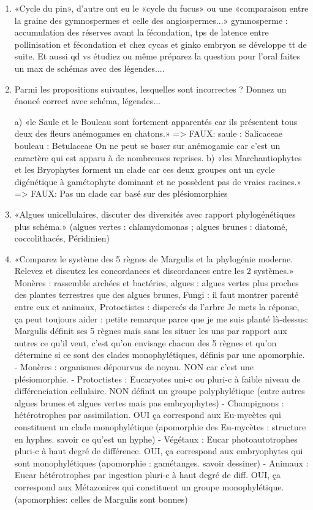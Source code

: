 \begin{enumerate}
	\item «Cycle du pin», d'autre ont eu le «cycle du fucus» ou une «comparaison entre la graine des gymnospermes et celle des angiospermes...» gymnosperme : accumulation des réserves avant la fécondation, tps de latence entre pollinisation et fécondation et chez cycas et ginko embryon se développe tt de suite.
 Et aussi qd vs étudiez ou même préparez la question pour l'oral faites un max de schémas avec des légendes....
 
 
	\item Parmi les propositions suivantes, lesquelles sont incorrectes ? Donnez un énoncé correct avec schéma, légendes... 

a) «le Saule et le Bouleau sont fortement apparentés car ils présentent tous deux des fleurs anémogames en chatons.»
=> FAUX: saule : Salicaceae bouleau : Betulaceae On ne peut se baser sur anémogamie car c’est un caractère qui est apparu à de nombreuses reprises.
 b) «les Marchantiophytes et les Bryophytes forment un clade car ces deux groupes ont un cycle digénétique à gamétophyte dominant et ne possèdent pas de vraies racines.»
=> FAUX: Pas un clade car basé sur des plésiomorphies

	\item «Algues unicellulaires, discuter des diversités avec rapport phylogénétiques plus schéma.» (algues vertes : chlamydomonas ; algues brunes : diatomé, coccolithacés, Péridinien)

	\item «Comparez le système des 5 règnes de Margulis et la phylogénie moderne. Relevez et discutez les concordances et discordances entre les 2 systèmes.»
 Monères : rassemble archées et bactéries, algues : algues vertes plus proches des plantes terrestres que des algues brunes, Fungi : il faut montrer parenté entre eux et animaux, Protoctistes : dispercés ds l’arbre
Je mets la réponse, ça peut toujours aider : petite remarque parce que je me suis planté là-dessus: Margulis définit ses 5 règnes mais sans les situer les uns par rapport aux autres ce qu'il veut, c'est qu'on envisage chacun des 5 règnes et qu'on détermine si ce sont des clades monophylétiques, définis par une apomorphie.
- Monères : organismes dépourvus de noyau. NON car c'est une plésiomorphie. 
- Protoctistes : Eucaryotes uni-c ou pluri-c à faible niveau de différenciation cellulaire. NON définit un groupe polyphylétique (entre autres algues brunes et algues vertes mais pas embryophytes)
- Champignons : hétérotrophes par assimilation. OUI ça correspond aux Eu-mycètes qui constituent un clade monophylétique (apomorphie des Eu-mycètes : structure en hyphes. savoir ce qu'est un hyphe)
- Végétaux : Eucar photoautotrophes pluri-c à haut degré de différence. OUI, ça correspond aux embryophytes qui sont monophylétiques (apomorphie : gamétanges. savoir dessiner)
- Animaux : Eucar hétérotrophes par ingestion pluri-c à haut degré de diff. OUI, ça correspond aux Métazoaires qui constituent un groupe monophylétique. (apomorphies: celles de Margulis sont bonnes)


\end{enumerate}
